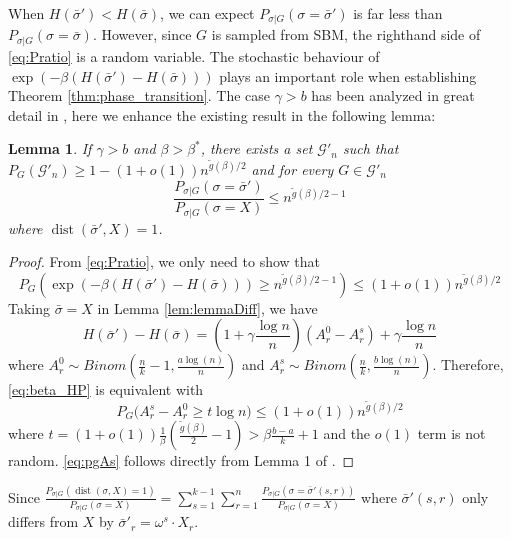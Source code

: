 \documentclass[journal]{IEEEtran}
\newtheorem{lemma}{Lemma}
\newcommand{\A}{\frac{a \log(n)}{n}}
\newcommand{\B}{\frac{b \log(n)}{n}}
\newcommand{\cG}{\mathcal{G}}
\DeclareMathOperator{\dist}{dist}
\begin{document}
When $H(\bar{\sigma}') < H(\bar{\sigma})$, we can expect $P_{\sigma | G}(\sigma = \bar{\sigma}')$ is far less than 
$P_{\sigma | G}(\sigma = \bar{\sigma})$. However,
since $G$ is sampled from SBM, the righthand side of \eqref{eq:Pratio} is a random variable. The stochastic behaviour
of $ \exp(-\beta(H(\bar{\sigma}') - H(\bar{\sigma}))) $ plays an important role when establishing Theorem \ref{thm:phase_transition}.
The case $\gamma > b$ has been analyzed in great detail in \cite{sibmmc}, here we enhance the existing result in the following lemma:
\begin{lemma}\label{lem:specialCase}
If $\gamma> b$ and $\beta > \beta^*$, there exists a set $\cG'_n$ such that
$P_G(\cG'_n) \geq 1 - (1+o(1))n^{\tilde{g}(\beta)/2}$ and for every $G\in \cG'_n$
\begin{equation}
\frac{P_{\sigma |G } (\sigma = \bar{\sigma}')}{P_{\sigma |G } (\sigma = X)} \leq n^{\tilde{g}(\beta)/2-1}
\end{equation}
where $\dist(\bar{\sigma}',X)=1$.
\end{lemma}
\begin{proof}
	From \eqref{eq:Pratio}, we only need to show that
	\begin{equation}\label{eq:beta_HP}
	P_G( \exp(-\beta(H(\bar{\sigma}') - H(\bar{\sigma}))) \geq n^{\tilde{g}(\beta)/2-1}) \leq (1+o(1))n^{\tilde{g}(\beta)/2}
	\end{equation}
	Taking $\bar{\sigma}=X$ in Lemma \ref{lem:lemmaDiff}, we have
	\begin{equation}\label{eq:energy_diff}
	H(\bar{\sigma}') - H(\bar{\sigma}) = (1+\gamma \frac{\log n}{n})(A^0_r - A^s_r) + \gamma\frac{\log n}{n}
	\end{equation}
	where $A_r^0 \sim Binom(\frac{n}{k}-1, \A)$ and $A^s_r \sim Binom(\frac{n}{k}, \B)$.
	Therefore, \eqref{eq:beta_HP} is equivalent with
	\begin{equation}\label{eq:pgAs}
	P_G\big(A^s_r - A_r^0 \geq t\log n\big)
	\leq (1+o(1))n^{\tilde{g}(\beta)/2}
	\end{equation}
	where $t=(1+o(1))\frac{1}{\beta}(\frac{\tilde{g}(\beta)}{2} -1)>\beta\frac{b-a}{k}+1$ and the $o(1)$ term is not random.
	\eqref{eq:pgAs} follows directly from Lemma 1 of \cite{sibmmc}.
\end{proof}
Since 
$\frac{P_{\sigma |G } (\dist(\sigma, X)=1)}{P_{\sigma |G } (\sigma = X)} = \sum_{s=1}^{k-1}
\sum_{r=1}^n \frac{P_{\sigma |G } (\sigma = \bar{\sigma}'(s,r))}{P_{\sigma |G } (\sigma = X)}$ 
where $\bar{\sigma}'(s,r)$ only differs from $X$ by $\bar{\sigma}'_r = \omega^s \cdot X_r$.
\end{document}
